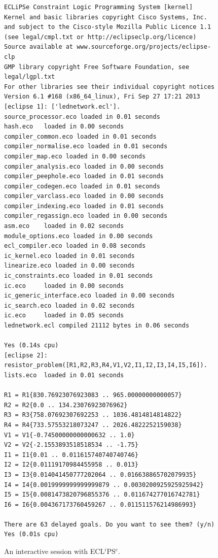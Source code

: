 \begin{figure}
\small\begin{verbatim}
ECLiPSe Constraint Logic Programming System [kernel]
Kernel and basic libraries copyright Cisco Systems, Inc.
and subject to the Cisco-style Mozilla Public Licence 1.1
(see legal/cmpl.txt or http://eclipseclp.org/licence)
Source available at www.sourceforge.org/projects/eclipse-clp
GMP library copyright Free Software Foundation, see legal/lgpl.txt
For other libraries see their individual copyright notices
Version 6.1 #168 (x86_64_linux), Fri Sep 27 17:21 2013
[eclipse 1]: ['lednetwork.ecl'].
source_processor.eco loaded in 0.01 seconds
hash.eco   loaded in 0.00 seconds
compiler_common.eco loaded in 0.01 seconds
compiler_normalise.eco loaded in 0.01 seconds
compiler_map.eco loaded in 0.00 seconds
compiler_analysis.eco loaded in 0.00 seconds
compiler_peephole.eco loaded in 0.01 seconds
compiler_codegen.eco loaded in 0.01 seconds
compiler_varclass.eco loaded in 0.00 seconds
compiler_indexing.eco loaded in 0.01 seconds
compiler_regassign.eco loaded in 0.00 seconds
asm.eco    loaded in 0.02 seconds
module_options.eco loaded in 0.00 seconds
ecl_compiler.eco loaded in 0.08 seconds
ic_kernel.eco loaded in 0.01 seconds
linearize.eco loaded in 0.00 seconds
ic_constraints.eco loaded in 0.01 seconds
ic.eco     loaded in 0.00 seconds
ic_generic_interface.eco loaded in 0.00 seconds
ic_search.eco loaded in 0.02 seconds
ic.eco     loaded in 0.05 seconds
lednetwork.ecl compiled 21112 bytes in 0.06 seconds

Yes (0.14s cpu)
[eclipse 2]: resistor_problem([R1,R2,R3,R4,V1,V2,I1,I2,I3,I4,I5,I6]).
lists.eco  loaded in 0.01 seconds

R1 = R1{830.76923076923083 .. 965.00000000000057}
R2 = R2{0.0 .. 134.23076923076962}
R3 = R3{758.07692307692253 .. 1036.4814814814822}
R4 = R4{733.57553218073247 .. 2026.4822252159038}
V1 = V1{-0.74500000000000632 .. 1.0}
V2 = V2{-2.1553893518518534 .. -1.75}
I1 = I1{0.01 .. 0.011615740740740746}
I2 = I2{0.01119170984455958 .. 0.013}
I3 = I3{0.014041450777202064 .. 0.016638865702079935}
I4 = I4{0.0019999999999999879 .. 0.0030200925925925942}
I5 = I5{0.0081473820796855376 .. 0.011674277016742781}
I6 = I6{0.004367173760459267 .. 0.011511576214986993}

There are 63 delayed goals. Do you want to see them? (y/n) 
Yes (0.01s cpu)
\end{verbatim}
\caption{An interactive session with ECL$^i$PS$^e$.}\label{fig:optimization}
\end{figure}
